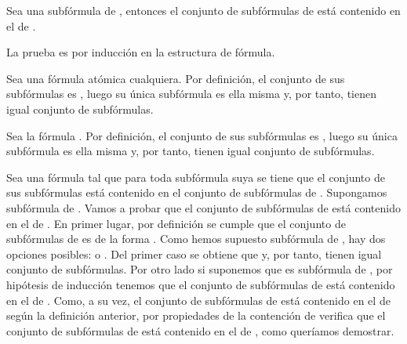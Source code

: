 \begin{isabellebody}
\begin{isamarkuptext}
  \begin{lema}
    Sea  una subfórmula de , entonces el conjunto de subfórmulas 
    de  está contenido en el de .
  \end{lema} 

  \begin{demostracion}
  La prueba es por inducción en la estructura de fórmula.
  
  Sea  una fórmula atómica cualquiera. Por definición, el conjunto de
  sus subfórmulas es , luego su única subfórmula es ella misma y,
  por tanto, tienen igual conjunto de subfórmulas.

  Sea la fórmula \isa{{\isasymbottom}}. Por definición, el conjunto de
  sus subfórmulas es \isa{{\isacharbraceleft}{\isasymbottom}{\isacharbraceright}}, luego su única subfórmula es ella misma y,
  por tanto, tienen igual conjunto de subfórmulas.

  Sea una fórmula  tal que para toda subfórmula suya se tiene que el
  conjunto de sus subfórmulas está contenido en el conjunto de 
  subfórmulas de .
  Supongamos  subfórmula de . Vamos a probar que el conjunto de
  subfórmulas de  está contenido en el de .
  En primer lugar, por definición se cumple que el conjunto de
  subfórmulas de  es de la forma .
  Como hemos supuesto  subfórmula de , hay dos opciones 
  posibles:  o . 
  Del primer caso se obtiene que  y, por tanto, tienen igual 
  conjunto de subfórmulas. 
  Por otro lado si suponemos que  es subfórmula de , por hipótesis
  de inducción tenemos que el conjunto de subfórmulas de  está 
  contenido en el de . Como, a su vez, el conjunto de subfórmulas
  de  está contenido en el de  según la definición anterior, 
  por propiedades de la contención de verifica que el conjunto de 
  subfórmulas de  está contenido en el de , como queríamos 
  demostrar.


\end{demostracion}
\end{isamarkuptext}
\end{isabellebody}
